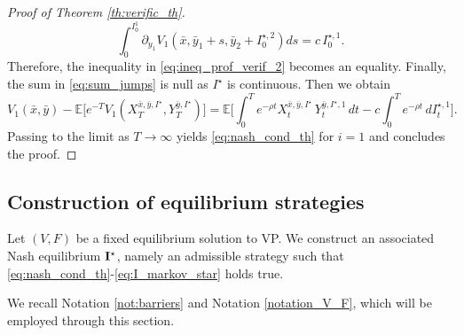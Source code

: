 \documentclass[10pt]{article}
\numberwithin{equation}{section}
\theoremstyle{plain}
\numberwithin{theorem}{section}
\theoremstyle{definition}
\newcommand{\<}{\langle}
\renewcommand{\>}{\rangle}
\renewcommand{\(}{\left(}
\renewcommand{\)}{\right)}
\newcommand\Eb{\mathbb{E}}
\newcommand\contr{{\bf I}}
\begin{document}
{{{\begin{proof}[Proof of Theorem \ref{th:verific_th}]
\begin{equation}
 \int_{0}^{I^1_0} \partial_{y_1} V_1 (\bar{x} , \bar{y}_{1} + s , \bar{y}_{2} + I^{\star,2}_0 ) ds = c\, I^{\star,1}_0.
\end{equation}
Therefore, %
the inequality in \eqref{eq:ineq_prof_verif_2} becomes an equality. Finally, the sum in \eqref{eq:sum_jumps} is null as $I^{\star}$ is continuous. Then we obtain
\begin{equation}%
V_1(\bar{x}, \bar{y}) - \Eb\big[  e^{- T } V_1(X^{\bar{x},\bar{y},I^{\star}}_{ T }, Y^{\bar{y},I^{\star}}_{ T }) \big] = 
\Eb\Big[     \int_{0}^{ T } e^{-\rho  t} X^{\bar{x},\bar{y},I^{\star}}_t\,  Y^{\bar{y},I^{\star},1}_t \,  dt -  c \int_{0}^{ T } e^{-\rho  t} \, d I^{\star,1}_t   \Big].
\end{equation}
Passing to the limit as $ T \to\infty$ yields \eqref{eq:nash_cond_th} for $i=1$ and concludes the proof.
\end{proof}


\subsection{Construction of equilibrium strategies}\label{sec:construc}

Let $(V,F)$ be a fixed equilibrium solution to VP. We construct an associated Nash equilibrium $\contr^{\star}$, namely an admissible strategy such that \eqref{eq:nash_cond_th}-\eqref{eq:I_markov_star} holds true. {We recall Notation \ref{not:barriers} and Notation \ref{notation_V_F}, which will be employed through this section. 

}}}}
\end{document}
